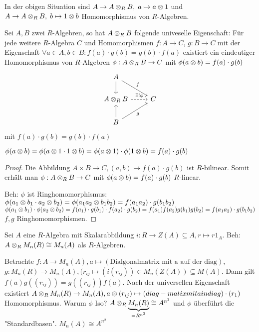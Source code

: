 \documentclass[../main.tex]{subfiles}
\begin{document}
\begin{remark}
    In der obigen Situation sind $A\rightarrow A\otimes_R B,\; a\mapsto a\otimes 1$ und
    $A\rightarrow A\otimes_R B,\;b\mapsto 1\otimes b$ %
    Homomorphismus von $R$-Algebren.
\end{remark}
\begin{theorem}
    Sei $A,B$ zwei $R$-Algebren, so hat $A\otimes_R B$ folgende univeselle Eigenschaft:
    Für jede weitere $R$-Algebra $C$ und Homomorphismen $f:A\rightarrow C$, $g:B\rightarrow C$ mit der Eigenschaft $\forall a\in A, b\in B: f(a)\cdot g(b) = g(b) \cdot f(a)$
    existiert ein eindeutiger Homomorphismus von $R$-Algebren $\phi:A\otimes_R B\rightarrow C$ mit $\phi(a\otimes b) = f(a)\cdot g(b)$
    $$%
\begin{tikzcd}
A \arrow[rd, "f"] \arrow[d]                 &   \\
A\ot_R B \arrow[r, "\exists !\phi", dashed] & C \\
B \arrow[u] \arrow[ru, "g"']                &  
\end{tikzcd}$$ mit $f(a)\cdot g(b) = g(b)\cdot f(a)$

$\phi(a\otimes b) = \phi(a\otimes 1 \cdot 1\otimes b) = \phi(a\otimes 1)\cdot \phi(1\otimes b) = f(a)\cdot g(b)$
\end{theorem}
\begin{proof}
    Die Abbildung $A\times B\rightarrow C, (a,b) \mapsto f(a)\cdot g(b)$ ist $R$-bilinear.
    Somit erhält man $\phi: A\otimes_R B \rightarrow C$ mit $\phi(a\otimes b) = f(a)\cdot g(b)$ $R$-linear.

    Beh: $\phi$ ist Ringhomomorphismus:
    $\phi(a_1\otimes b_1 \cdot a_2 \otimes b_2) =\phi(a_1a_2\otimes b_1b_2) = f(a_1a_2) \cdot g(b_1b_2)$\\
    $\phi(a_1\otimes b_1) \cdot \phi(a_2\otimes b_2) = f(a_1)\cdot g(b_1)\cdot f(a_2)\cdot g(b_2) =f(a_1)f(a_2)g(b_1)g(b_2) = f(a_1a_2)\cdot g(b_1b_2)$
    $f,g$ Ringhomomorphismen.
\end{proof}
\begin{example}
    Sei $A$ eine $R$-Algebra mit Skalarabbildung $i:R\rightarrow Z(A)\subseteq A, r\mapsto r1_A$.
    Beh: $A\otimes_R M_n(R)\cong M_n(A)$ als $R$-Algebren.

    Betrachte $f:A\rightarrow M_n(A), a\mapsto (\text{Dialgonalmatrix mit a auf der diag})$, $g:M_n(R)\rightarrow M_n(A), (r_{ij}\mapsto (i(r_{ij}))\in M_n(Z(A)) \subseteq M(A)$.
    Dann gilt $f(a)g((r_{ij})) = g((r_{ij})) f(a)$.
    Nach der universellen Eigenschaft existiert $A\otimes_R M_n(R) \rightarrow M_n(A), a\otimes (r_{ij}) \mapsto (diag-matix mit a in diag) \cdot (r_1)$ Homomorphismus.
    Warum $\phi$ Iso? $A\otimes_R \underbrace{M_n(R)}_{=R^{n^2}}\cong A^{n^2}$ und $\phi$ überführt die "Standardbasen".
    $M_n(A)\cong A^{n^2}$
\end{example}
\end{document}
